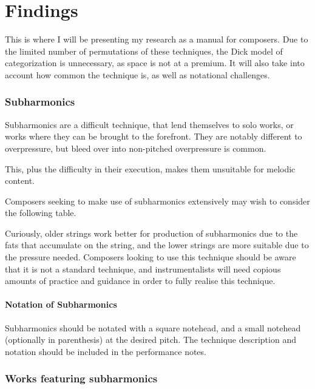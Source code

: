 
\chapter{Findings}
This is where I will be presenting my research as a manual for composers. 
Due to the limited number of permutations of these techniques, the Dick model of categorization is unnecessary, as space is not at a premium.\autocite{dickOtherFlute1989} 
It will also take into account how common the technique is, as well as notational challenges.

\subsection{Subharmonics} \label{sec:subharmonics}
Subharmonics are a difficult technique, that lend themselves to solo works, or works where they can be brought to the forefront.
They are notably different to overpressure, but bleed over into non-pitched overpressure is common.

This, plus the difficulty in their execution, makes them unsuitable for melodic content.


Composers seeking to make use of subharmonics extensively may wish to consider the following table.



    Curiously, older strings work better for production of subharmonics due to the fats that accumulate on the string, and the lower strings are more suitable due to the pressure needed.\autocite{kimuraHowProduceSubharmonics1999}
Composers looking to use this technique should be aware that it is not a standard technique, and instrumentalists will need copious amounts of practice and guidance in order to fully realise this technique.

\subsubsection{Notation of Subharmonics}
Subharmonics should be notated with a square notehead, and a small notehead (optionally in parenthesis) at the desired pitch.
The technique description and notation should be included in the performance notes.

\subsection{Works featuring subharmonics }\label{sec:subharmonicsLiterature}


